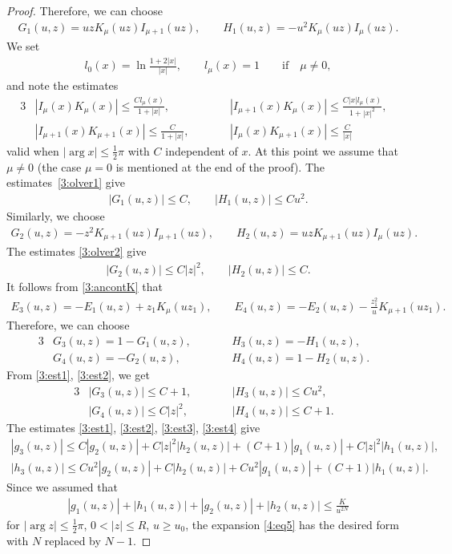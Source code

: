 \documentclass[11pt]{article}
\numberwithin{equation}{section}
\begin{document}
\begin{proof}
Therefore, we can choose
\begin{gather*}
G_1(u,z) = uz K_\mu(uz)I_{\mu+1}(uz),\qquad
H_1(u,z) = -u^2K_\mu(uz)I_\mu(uz) .
\end{gather*}
We set
\begin{gather*}
l_0(x)=\ln\frac{1+2|x|}{|x|},\qquad l_\mu(x)=1\qquad\text{if} \quad \mu\ne 0,
\end{gather*}
and note the estimates \cite[(9.12)]{O}
\begin{alignat}{3}
&|I_\mu(x)K_\mu(x)|\le \frac{C l_\mu(x)}{1+|x|},\qquad&& |I_{\mu+1}(x)K_\mu(x)|\le \frac{C |x|l_\mu(x)}{1+|x|^2},& \label{3:olver1}\\
& |I_{\mu+1}(x)K_{\mu+1}(x)|\le \frac{C}{1+|x|},\qquad&& |I_\mu(x)K_{\mu+1}(x)|\le \frac{C}{|x|}& \label{3:olver2}
\end{alignat}
valid when $|\arg x|\le \frac12\pi$ with $C$ independent of $x$.
At this point we assume that $\mu\ne0$ (the case $\mu=0$ is mentioned at the end of the proof). The estimates~\eqref{3:olver1} give
\begin{gather}\label{3:est1}
|G_1(u,z)|\le C,\qquad |H_1(u,z)|\le C u^2.
\end{gather}
Similarly, we choose
\begin{gather*}
G_2(u,z) = -z^2K_{\mu+1}(uz)I_{\mu+1}(uz),\qquad
H_2(u,z) = uzK_{\mu+1}(uz)I_\mu(uz).
\end{gather*}
The estimates \eqref{3:olver2} give
\begin{gather}\label{3:est2}
|G_2(u,z)|\le C|z|^2,\qquad|H_2(u,z)|\le C.
\end{gather}
It follows from \eqref{3:ancontK} that
\begin{gather*}
E_3(u,z) = -E_1(u,z)+ z_1K_\mu(uz_1),\qquad
E_4(u,z) = -E_2(u,z)-\frac{z_1^2}{u}K_{\mu+1}(uz_1) .
\end{gather*}
Therefore, we can choose
\begin{alignat*}{3}
& G_3(u,z) = 1-G_1(u,z) ,\qquad &&
H_3(u,z) = -H_1(u,z),&\\
& G_4(u,z) = -G_2(u,z),\qquad&&
H_4(u,z) = 1-H_2(u,z).&
\end{alignat*}
From \eqref{3:est1}, \eqref{3:est2}, we get
\begin{alignat}{3}
& |G_3(u,z)|\le C+1,\qquad && |H_3(u,z)|\le C u^2,& \label{3:est3}\\
& |G_4(u,z)|\le C|z|^2,\qquad && |H_4(u,z)|\le C+1 .&\label{3:est4}
\end{alignat}
The estimates \eqref{3:est1}, \eqref{3:est2}, \eqref{3:est3}, \eqref{3:est4}
give
\begin{gather*}
|g_3(u,z)| \le C |g_2(u,z)| + C|z|^2|h_2(u,z)|+(C+1)|g_1(u,z)|+C|z|^2 |h_1(u,z)|,\\
|h_3(u,z)| \le C u^2|g_2(u,z)| + C|h_2(u,z)|+Cu^2|g_1(u,z)|+(C+1) |h_1(u,z)|.
\end{gather*}
Since we assumed that
\begin{gather*}
|g_1(u,z)|+|h_1(u,z)|+|g_2(u,z)|+|h_2(u,z)|\le \frac{K}{u^{2N}}
\end{gather*}
for $| \arg z|\le \frac12\pi$, $0<|z|\le R$, $u\ge u_0$,
the expansion \eqref{4:eq5} has the desired form with $N$ replaced by $N-1$.


\end{proof}
\end{document}
